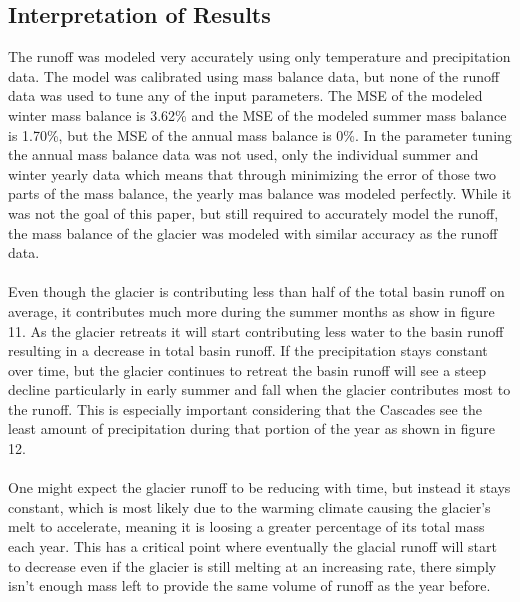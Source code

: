 \documentclass{article}
\begin{document}
\subsection{Interpretation of Results}
The runoff was modeled very accurately using only temperature and precipitation data. The model was calibrated using mass balance data, but 
none of the runoff data was used to tune any of the input parameters. The MSE of the modeled winter mass balance is 3.62\% and the MSE of the 
modeled summer mass balance is 1.70\%, but the MSE of the annual mass balance is 0\%. In the parameter tuning the annual mass balance data 
was not used, only the individual summer and winter yearly data which means that through minimizing the error of those two parts of the 
mass balance, the yearly mas balance was modeled perfectly. 
While it was not the goal of this paper, but still required to accurately model the runoff, the mass balance of the glacier was modeled 
with similar accuracy as the runoff data. 
\paragraph{}
Even though the glacier is contributing less than half of the total basin runoff on average, it contributes much more during the summer 
months as show in figure 11. As the glacier retreats it will start contributing less water to the basin runoff resulting in a decrease in total 
basin runoff. If the precipitation stays constant over time, but the glacier continues to retreat the basin runoff will see a steep decline 
particularly in early summer and fall when the glacier contributes most to the runoff. This is especially important considering that the 
Cascades see the least amount of precipitation during that portion of the year as shown in figure 12. 
\paragraph{}
One might expect the glacier runoff to be reducing with time, but instead it stays constant, which is most likely due to the 
warming climate causing the glacier's melt to accelerate, meaning it is loosing a greater percentage of its total mass each year. 
This has a critical point where eventually the glacial runoff will start to decrease even if the glacier is still melting at an increasing 
rate, there simply isn't enough mass left to provide the same volume of runoff as the year before.
\end{document}
